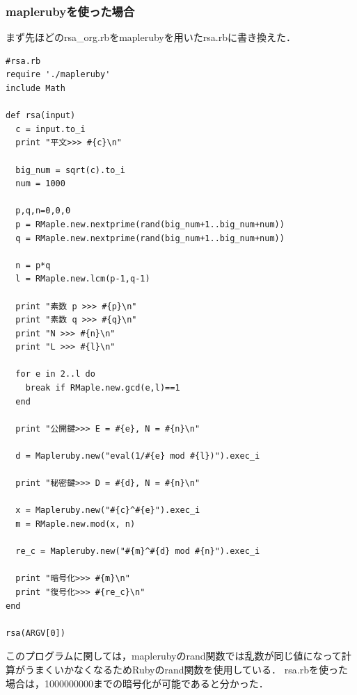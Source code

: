 \subsubsection{maplerubyを使った場合}
まず先ほどのrsa\_org.rbをmaplerubyを用いたrsa.rbに書き換えた．
\begin{lstlisting}[style=customRuby,basicstyle={\scriptsize\ttfamily}]
#rsa.rb
require './mapleruby'
include Math

def rsa(input)
  c = input.to_i
  print "平文>>> #{c}\n"
  
  big_num = sqrt(c).to_i
  num = 1000
  
  p,q,n=0,0,0
  p = RMaple.new.nextprime(rand(big_num+1..big_num+num))
  q = RMaple.new.nextprime(rand(big_num+1..big_num+num))
  
  n = p*q
  l = RMaple.new.lcm(p-1,q-1)
  
  print "素数 p >>> #{p}\n"
  print "素数 q >>> #{q}\n"
  print "N >>> #{n}\n"
  print "L >>> #{l}\n"
  
  for e in 2..l do
    break if RMaple.new.gcd(e,l)==1
  end
  
  print "公開鍵>>> E = #{e}, N = #{n}\n"
  
  d = Mapleruby.new("eval(1/#{e} mod #{l})").exec_i
  
  print "秘密鍵>>> D = #{d}, N = #{n}\n"
  
  x = Mapleruby.new("#{c}^#{e}").exec_i
  m = RMaple.new.mod(x, n)
  
  re_c = Mapleruby.new("#{m}^#{d} mod #{n}").exec_i
  
  print "暗号化>>> #{m}\n"
  print "復号化>>> #{re_c}\n"
end

rsa(ARGV[0])
\end{lstlisting}
このプログラムに関しては，maplerubyのrand関数では乱数が同じ値になって計算がうまくいかなくなるためRubyのrand関数を使用している．
rsa.rbを使った場合は，1000000000までの暗号化が可能であると分かった．
